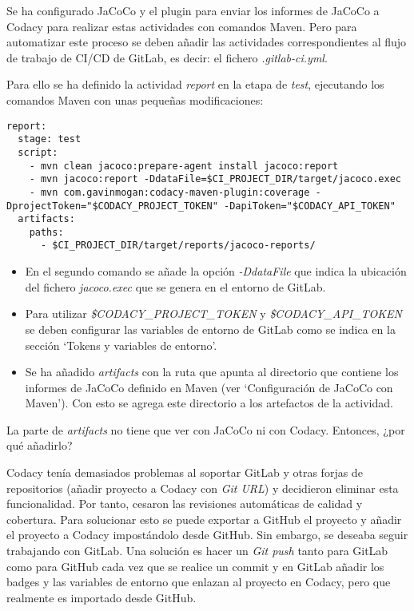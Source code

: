 Se ha configurado JaCoCo y el plugin para enviar los informes de JaCoCo a Codacy para realizar estas actividades con comandos Maven. Pero para automatizar este proceso se deben añadir las actividades correspondientes al flujo de trabajo de CI/CD de GitLab, es decir: el fichero \textit{.gitlab-ci.yml}.

Para ello se ha definido la actividad \textit{report} en la etapa de \textit{test}, ejecutando los comandos Maven  con unas pequeñas modificaciones:\\
\begin{minipage}{\linewidth}
{\tiny
\begin{lstlisting}[breaklines]
report:
  stage: test
  script:
	- mvn clean jacoco:prepare-agent install jacoco:report
	- mvn jacoco:report -DdataFile=$CI_PROJECT_DIR/target/jacoco.exec
	- mvn com.gavinmogan:codacy-maven-plugin:coverage -DprojectToken="$CODACY_PROJECT_TOKEN" -DapiToken="$CODACY_API_TOKEN"
  artifacts:
	paths:
	  - $CI_PROJECT_DIR/target/reports/jacoco-reports/
\end{lstlisting}
}
\end{minipage}
\begin{itemize}
	\item En el segundo comando se añade la opción \textit{-DdataFile} que indica la ubicación del fichero \textit{jacoco.exec} que se genera en el entorno de GitLab.
	\item Para utilizar \textit{\$CODACY\_PROJECT\_TOKEN} y \textit{\$CODACY\_API\_TOKEN} se deben configurar las variables de entorno de GitLab como se indica en la sección `Tokens y variables de entorno'.
	\item Se ha añadido \textit{artifacts} con la ruta que apunta al directorio que contiene los informes de JaCoCo definido en Maven (ver `Configuración de JaCoCo con Maven'). Con esto se agrega este directorio a los artefactos de la actividad.
\end{itemize}

La parte de \textit{artifacts} no tiene que ver con JaCoCo ni con Codacy. Entonces, ¿por qué añadirlo? 

Codacy tenía demasiados problemas al soportar GitLab y otras forjas de repositorios (añadir proyecto a Codacy con \textit{Git URL}) y decidieron eliminar esta funcionalidad. Por tanto, cesaron las revisiones automáticas de calidad y cobertura. Para solucionar esto se puede exportar a GitHub el proyecto y añadir el proyecto a Codacy impostándolo desde GitHub. Sin embargo, se deseaba seguir trabajando con GitLab. Una solución es hacer un \textit{Git push} tanto para GitLab como para GitHub cada vez que se realice un commit y en GitLab añadir los badges y las variables de entorno que enlazan al proyecto en Codacy, pero que realmente es importado desde GitHub.

